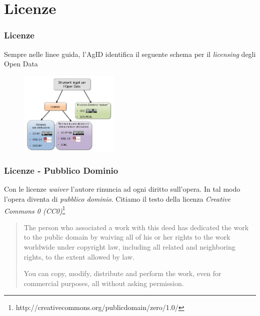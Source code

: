 \documentclass[8pt]{beamer}
\begin{document}
\section{Licenze}

\begin{frame}
\frametitle{Licenze}
  Sempre nelle linee guida, l'AgID identifica il seguente schema per il \emph{licensing}
  degli Open Data
  \begin{figure}
    \includegraphics[width=180px]{licenze.png} 
  \end{figure}
\end{frame}

\begin{frame}
\frametitle{Licenze - Pubblico Dominio}
  Con le licenze \emph{waiver} l'autore rinuncia ad ogni diritto sull'opera. In tal modo
  l'opera diventa di \emph{pubblico dominio}. Citiamo il testo della licenza
  \emph{Creative Commons 0 (CC0)}\footnote{http://creativecommons.org/publicdomain/zero/1.0/}
  \vspace{\baselineskip}
  
   \begin{quote}
The person who associated a work with this deed has dedicated the work to the public domain by waiving all of his or her rights to the work worldwide under copyright law, including all related and neighboring rights, to the extent allowed by law.

You can copy, modify, distribute and perform the work, even for commercial purposes, all without asking permission.
   \end{quote}
   

\end{frame}
\end{document}

